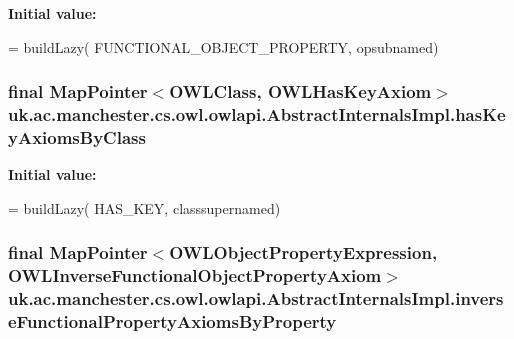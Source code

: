 {\bfseries Initial value\-:}
\begin{DoxyCode}
= buildLazy(
            FUNCTIONAL\_OBJECT\_PROPERTY, opsubnamed)
\end{DoxyCode}
\hypertarget{classuk_1_1ac_1_1manchester_1_1cs_1_1owl_1_1owlapi_1_1_abstract_internals_impl_a47b2fcc514b40007a4efa0e5658a640a}{
\subsubsection[{has\-Key\-Axioms\-By\-Class}]{\setlength{\rightskip}{0pt plus 5cm}final Map\-Pointer$<${\bf O\-W\-L\-Class}, {\bf O\-W\-L\-Has\-Key\-Axiom}$>$ uk.\-ac.\-manchester.\-cs.\-owl.\-owlapi.\-Abstract\-Internals\-Impl.\-has\-Key\-Axioms\-By\-Class\hspace{0.3cm}{\ttfamily [protected]}}}\label{classuk_1_1ac_1_1manchester_1_1cs_1_1owl_1_1owlapi_1_1_abstract_internals_impl_a47b2fcc514b40007a4efa0e5658a640a}
{\bfseries Initial value\-:}
\begin{DoxyCode}
= buildLazy(
            HAS\_KEY, classsupernamed)
\end{DoxyCode}
\hypertarget{classuk_1_1ac_1_1manchester_1_1cs_1_1owl_1_1owlapi_1_1_abstract_internals_impl_a2aacaf09a34ac2532a44ccaa7bbc24e2}{
\subsubsection[{inverse\-Functional\-Property\-Axioms\-By\-Property}]{\setlength{\rightskip}{0pt plus 5cm}final Map\-Pointer$<${\bf O\-W\-L\-Object\-Property\-Expression}, {\bf O\-W\-L\-Inverse\-Functional\-Object\-Property\-Axiom}$>$ uk.\-ac.\-manchester.\-cs.\-owl.\-owlapi.\-Abstract\-Internals\-Impl.\-inverse\-Functional\-Property\-Axioms\-By\-Property\hspace{0.3cm}{\ttfamily [protected]}}}\label{classuk_1_1ac_1_1manchester_1_1cs_1_1owl_1_1owlapi_1_1_abstract_internals_impl_a2aacaf09a34ac2532a44ccaa7bbc24e2}
